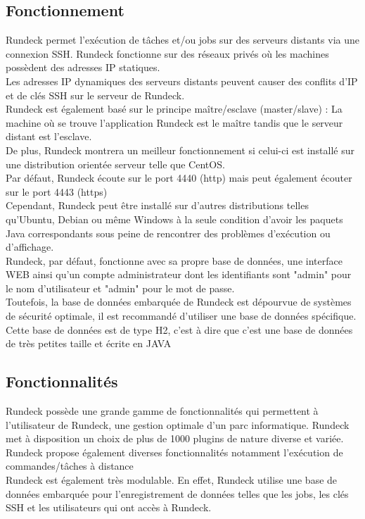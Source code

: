 \documentclass[12pt]{article}
\begin{document}
\subsection{Fonctionnement}

Rundeck permet l'exécution de tâches et/ou jobs sur des serveurs distants via une connexion SSH. Rundeck fonctionne sur des réseaux privés où les machines possèdent des adresses IP statiques. 
\\
Les adresses IP dynamiques des serveurs distants peuvent causer des conflits d'IP et de clés SSH sur le serveur de Rundeck.
\\
Rundeck est également basé sur le principe maître/esclave (master/slave) : La machine où se trouve l'application Rundeck est le maître tandis que le serveur distant est l'esclave. 
\\
De plus, Rundeck montrera un meilleur fonctionnement si celui-ci est installé sur une distribution orientée serveur telle que CentOS. 
\\
Par défaut, Rundeck écoute sur le port 4440 (http) mais peut également écouter sur le port 4443 (https)
\\
Cependant, Rundeck peut être installé sur d'autres distributions telles qu'Ubuntu, Debian ou même Windows à la seule condition d'avoir les paquets Java correspondants sous peine de rencontrer des problèmes d'exécution ou d'affichage.
\\
Rundeck, par défaut, fonctionne avec sa propre base de données, une interface WEB ainsi qu'un compte administrateur dont les identifiants sont "admin" pour le nom d'utilisateur et "admin" pour le mot de passe.
\\
Toutefois, la base de données embarquée de Rundeck est dépourvue de systèmes de sécurité optimale, il est recommandé d'utiliser une base de données spécifique.
\\
Cette base de données est de type H2, c'est à dire que c'est une base de données de très petites taille et écrite en JAVA 

\subsection{Fonctionnalités}

Rundeck possède une grande gamme de fonctionnalités qui permettent à l'utilisateur de Rundeck, une gestion optimale d'un parc informatique. Rundeck met à disposition un choix de plus de 1000 plugins de nature diverse et variée. 
\\
Rundeck propose également diverses fonctionnalités notamment l'exécution de commandes/tâches à distance
\\
Rundeck est également très modulable. En effet, Rundeck utilise une base de données embarquée pour l'enregistrement de données telles que les jobs, les clés SSH et les utilisateurs qui ont accès à Rundeck.
\end{document}
